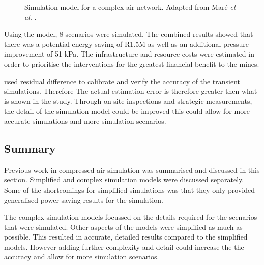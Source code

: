   \begin{figure}[h!]
  	\centering
  	\caption[Simulation model for a complex air network.]{Simulation model for a complex air network. Adapted from Maré \textit{et al.} \cite{Mare2017Evaluating}.}
  	\label{fig:Mare model}
  \end{figure}
\par 
Using the model, 8 scenarios were simulated. The combined results showed that there was a potential energy saving of R1.5M as well as an additional pressure improvement of 51 kPa. The infrastructure and resource costs were estimated in order to prioritise the interventions for the greatest financial benefit to the mines.	
\par
	\cite{Mare2017Evaluating} used residual difference to calibrate and verify the accuracy of the transient simulations. Therefore The actual estimation error is therefore greater then what is shown in the study. Through on site inspections and strategic measurements, the detail of the simulation model could be improved this could allow for more accurate simulations and more simulation scenarios.
	\subsection{Summary}\label{Shortcomings of previous work}
	Previous work in compressed air simulation was summarised and discussed in this section. Simplified and complex simulation models were discussed separately. Some of the shortcomings for simplified simulations was that they only provided generalised power saving results for the simulation.
	\par 
	The complex simulation models focussed on the details required for the scenarios that were simulated. Other aspects of the models were simplified as much as possible. This resulted in accurate, detailed results compared to the simplified models. However adding further complexity and detail could increase the the accuracy and allow for more simulation scenarios.
